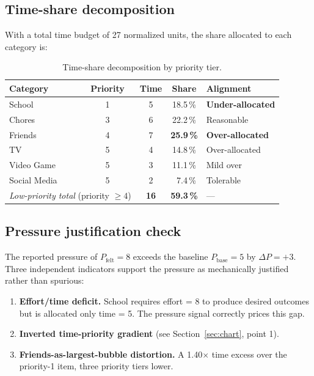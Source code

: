 \documentclass[11pt,a4paper]{article}
\begin{document}
\subsection{Time-share decomposition}
With a total time budget of 27 normalized units, the share allocated to each category is:

\begin{table}[h]
\centering
\renewcommand{\arraystretch}{1.2}
\begin{tabular}{lcccl}
\toprule
\textbf{Category} & \textbf{Priority} & \textbf{Time} & \textbf{Share} & \textbf{Alignment} \\
\midrule
School        & 1 & 5 & 18.5\,\% & \textcolor{accent2}{\textbf{Under-allocated}} \\
Chores        & 3 & 6 & 22.2\,\% & Reasonable \\
Friends       & 4 & 7 & \textbf{25.9\,\%} & \textcolor{accent2}{\textbf{Over-allocated}} \\
TV            & 5 & 4 & 14.8\,\% & Over-allocated \\
Video Game    & 5 & 3 & 11.1\,\% & Mild over \\
Social Media  & 5 & 2 & ~7.4\,\% & Tolerable \\
\midrule
\multicolumn{2}{l}{\textit{Low-priority total} (priority $\geq 4$)} & \textbf{16} & \textbf{59.3\,\%} & --- \\
\bottomrule
\end{tabular}
\caption{Time-share decomposition by priority tier.}
\label{tab:share}
\end{table}

\subsection{Pressure justification check}
The reported pressure of $P_\text{felt} = 8$ exceeds the baseline $P_\text{base} = 5$ by $\Delta P = +3$. Three independent indicators support the pressure as mechanically justified rather than spurious:

\begin{enumerate}[leftmargin=1.6em, itemsep=2pt]
  \item \textbf{Effort/time deficit.} School requires effort = 8 to produce desired outcomes but is allocated only time = 5. The pressure signal correctly prices this gap.
  \item \textbf{Inverted time-priority gradient} (see Section~\ref{sec:chart}, point 1).
  \item \textbf{Friends-as-largest-bubble distortion.} A 1.40$\times$ time excess over the priority-1 item, three priority tiers lower.
\end{enumerate}
\end{document}
